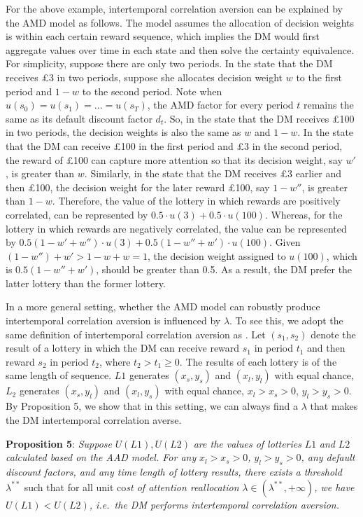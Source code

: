 \documentclass[
  12pt,
]{article}
\begin{document}
For the above example, intertemporal correlation aversion can be
explained by the AMD model as follows. The model assumes the allocation
of decision weights is within each certain reward sequence, which
implies the DM would first aggregate values over time in each state and
then solve the certainty equivalence. For simplicity, suppose there are
only two periods. In the state that the DM receives £3 in two periods,
suppose she allocates decision weight \(w\) to the first period and
\(1-w\) to the second period. Note when \(u(s_0)=u(s_1)=...=u(s_T)\),
the AMD factor for every period \(t\) remains the same as its default
discount factor \(d_t\). So, in the state that the DM receives £100 in
two periods, the decision weights is also the same as \(w\) and \(1-w\).
In the state that the DM can receive £100 in the first period and £3 in
the second period, the reward of £100 can capture more attention so that
its decision weight, say \(w'\), is greater than \(w\). Similarly, in
the state that the DM receives £3 earlier and then £100, the decision
weight for the later reward £100, say \(1-w''\), is greater than
\(1-w\). Therefore, the value of the lottery in which rewards are
positively correlated, can be represented by
\(0.5\cdot u(3)+0.5\cdot u(100)\). Whereas, for the lottery in which
rewards are negatively correlated, the value can be represented by
\(0.5(1-w'+w'')\cdot u(3)+0.5(1-w''+w')\cdot u(100)\). Given
\((1-w'')+w'>1-w+w=1\), the decision weight assigned to \(u(100)\),
which is \(0.5(1-w''+w')\), should be greater than 0.5. As a result, the
DM prefer the latter lottery than the former lottery.

In a more general setting, whether the AMD model can robustly produce
intertemporal correlation aversion is influenced by \(\lambda\). To see
this, we adopt the same definition of intertemporal correlation aversion
as \citet{bommier2005risk}. Let \((s_1,s_2)\) denote the result of a
lottery in which the DM can receive reward \(s_1\) in period \(t_1\) and
then reward \(s_2\) in period \(t_2\), where \(t_2>t_1\geq 0\). The
results of each lottery is of the same length of sequence. \(L1\)
generates \((x_s,y_s)\) and \((x_l,y_l)\) with equal chance, \(L_2\)
generates \((x_s,y_l)\) and \((x_l,y_s)\) with equal chance,
\(x_l>x_s>0\), \(y_l>y_s>0\). By Proposition 5, we show that in this
setting, we can always find a \(\lambda\) that makes the DM
intertemporal correlation averse.

\noindent \textbf{Proposition 5}: \emph{Suppose} \(U(L1), U(L2)\)
\emph{are the values of lotteries} \(L1\) \emph{and} \(L2\)
\emph{calculated based on the AAD model. For any} \(x_l>x_s>0\)\emph{,}
\(y_l>y_s>0\)\emph{, any default discount factors, and any time length
of lottery results, there exists} \emph{a threshold} \(\lambda^{**}\)
such that for all unit co\emph{st of attention reallocation}
\(\lambda\in(\lambda^{**},+\infty)\)\emph{, we have}
\(U(L1)<U(L2)\)\emph{, i.e.~the DM performs intertemporal correlation
aversion.}
\end{document}

